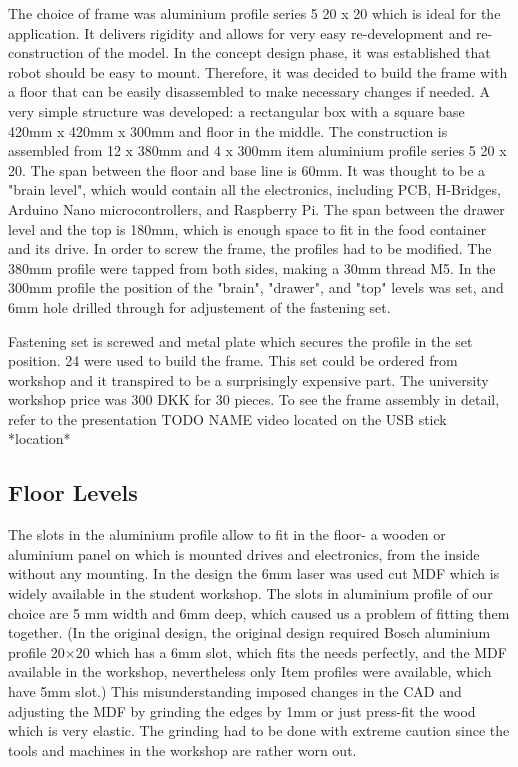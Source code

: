 \documentclass[11pt]{article}
\begin{document}
 
The choice of frame was aluminium profile series 5 20 x 20 which is ideal for the application. It delivers rigidity and allows for very easy re-development and re-construction of the model. In the concept design phase, it was established that robot should be easy to mount. Therefore, it was decided to build the frame with a floor that can be easily disassembled to make necessary changes if needed. A very simple structure was developed: a rectangular box with a square base 420mm x 420mm x 300mm and floor in the middle. The construction is assembled from 12 x 380mm and 4 x 300mm item aluminium profile series 5 20 x 20.  The span between the floor and base line is 60mm. It was thought to be a "brain level", which would contain all the electronics, including PCB, H-Bridges, Arduino Nano microcontrollers, and Raspberry Pi. The span between the drawer level and the top is 180mm, which is enough space to fit in the food container and its drive. In order to screw the frame, the profiles had to be modified. The 380mm profile were tapped from both sides, making a 30mm thread M5. In the 300mm profile the position of the "brain", "drawer", and "top" levels was set, and 6mm hole drilled through for adjustement of the fastening set.


Fastening set is screwed and metal plate which secures the profile in the set position. 24 were used to build the frame. This set could be ordered from workshop and it transpired to be a surprisingly expensive part. The university workshop price was 300 DKK for 30 pieces. To see the frame assembly in detail, refer to the presentation TODO NAME video located on the USB stick *location* 

\subsection*{Floor Levels}

The slots in the aluminium profile allow to fit in the floor- a wooden or aluminium panel on which is mounted drives and electronics, from the inside without any mounting. In the design the 6mm laser was used cut MDF which is widely available in the student workshop. The slots in aluminium profile of our choice are 5 mm width and 6mm deep, which caused us a problem of fitting them together. (In the original design, the original design required Bosch aluminium profile 20$\times$20 which has a 6mm slot, which fits the needs perfectly, and the MDF available in the workshop, nevertheless only Item profiles were available, which have 5mm slot.) This misunderstanding imposed changes in the CAD and adjusting the MDF by grinding the edges by 1mm or just press-fit the wood which is very elastic. The grinding had to be done with extreme caution since the tools and machines in the workshop are rather worn out.
\end{document}
